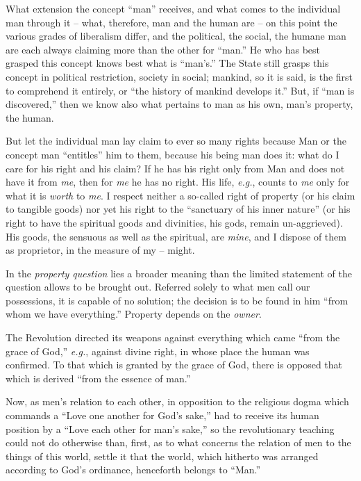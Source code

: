 What extension the concept ``man'' receives, and what comes to the 
individual man through it -- what, therefore, man and the human are -- on this 
point the various grades of liberalism differ, and the political, the social, 
the humane man are each always claiming more than the other for ``man.'' He 
who has best grasped this concept knows best what is ``man's.'' The State 
still grasps this concept in political restriction, society in social; 
mankind, so it is said, is the first to comprehend it entirely, or ``the 
history of mankind develops it.'' But, if ``man is discovered,'' then we 
know also what pertains to man as his own, man's property, the human.

But let the individual man lay claim to ever so many rights because Man or the 
concept man ``entitles'' him to them, because his being man does it: what do 
I care for his right and his claim? If he has his right only from Man and does 
not have it from \textit{me}, then for \textit{me} he has no right. His life, 
\textit{e.g.}, counts to \textit{me} only for what it is \textit{worth} to 
\textit{me}. I respect neither a so-called right of property (or his claim to 
tangible goods) nor yet his right to the ``sanctuary of his inner nature'' 
(or his right to have the spiritual goods and divinities, his gods, remain 
un-aggrieved). His goods, the sensuous as well as the spiritual, are 
\textit{mine}, and I dispose of them as proprietor, in the measure of my -- 
might.

In the \textit{property question} lies a broader meaning than the limited 
statement of the question allows to be brought out. Referred solely to what 
men call our possessions, it is capable of no solution; the decision is to be 
found in him ``from whom we have everything.'' Property depends on the 
\textit{owner}.

The Revolution directed its weapons against everything which came ``from the 
grace of God,'' \textit{e.g.}, against divine right, in whose place the 
human was confirmed. To that which is granted by the grace of God, there is 
opposed that which is derived ``from the essence of man.''

Now, as men's relation to each other, in opposition to the religious dogma 
which commands a ``Love one another for God's sake,'' had to receive its 
human position by a ``Love each other for man's sake,'' so the revolutionary 
teaching could not do otherwise than, first, as to what concerns the relation 
of men to the things of this world, settle it that the world, which hitherto 
was arranged according to God's ordinance, henceforth belongs to ``Man.''

